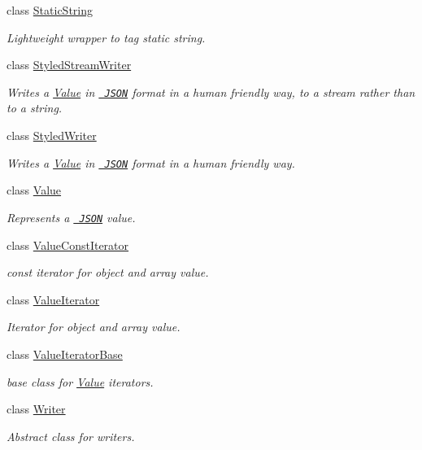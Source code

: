 \begin{DoxyCompactItemize}
class \mbox{\hyperlink{class_json_1_1_static_string}{Static\+String}}
\begin{DoxyCompactList}\small\item\em Lightweight wrapper to tag static string. \end{DoxyCompactList}\item 
class \mbox{\hyperlink{class_json_1_1_styled_stream_writer}{Styled\+Stream\+Writer}}
\begin{DoxyCompactList}\small\item\em Writes a \mbox{\hyperlink{class_json_1_1_value}{Value}} in \href{http://www.json.org}{\texttt{ J\+S\+ON}} format in a human friendly way, to a stream rather than to a string. \end{DoxyCompactList}\item 
class \mbox{\hyperlink{class_json_1_1_styled_writer}{Styled\+Writer}}
\begin{DoxyCompactList}\small\item\em Writes a \mbox{\hyperlink{class_json_1_1_value}{Value}} in \href{http://www.json.org}{\texttt{ J\+S\+ON}} format in a human friendly way. \end{DoxyCompactList}\item 
class \mbox{\hyperlink{class_json_1_1_value}{Value}}
\begin{DoxyCompactList}\small\item\em Represents a \href{http://www.json.org}{\texttt{ J\+S\+ON}} value. \end{DoxyCompactList}\item 
class \mbox{\hyperlink{class_json_1_1_value_const_iterator}{Value\+Const\+Iterator}}
\begin{DoxyCompactList}\small\item\em const iterator for object and array value. \end{DoxyCompactList}\item 
class \mbox{\hyperlink{class_json_1_1_value_iterator}{Value\+Iterator}}
\begin{DoxyCompactList}\small\item\em Iterator for object and array value. \end{DoxyCompactList}\item 
class \mbox{\hyperlink{class_json_1_1_value_iterator_base}{Value\+Iterator\+Base}}
\begin{DoxyCompactList}\small\item\em base class for \mbox{\hyperlink{class_json_1_1_value}{Value}} iterators. \end{DoxyCompactList}\item 
class \mbox{\hyperlink{class_json_1_1_writer}{Writer}}
\begin{DoxyCompactList}\small\item\em Abstract class for writers. \end{DoxyCompactList}\end{DoxyCompactItemize}
